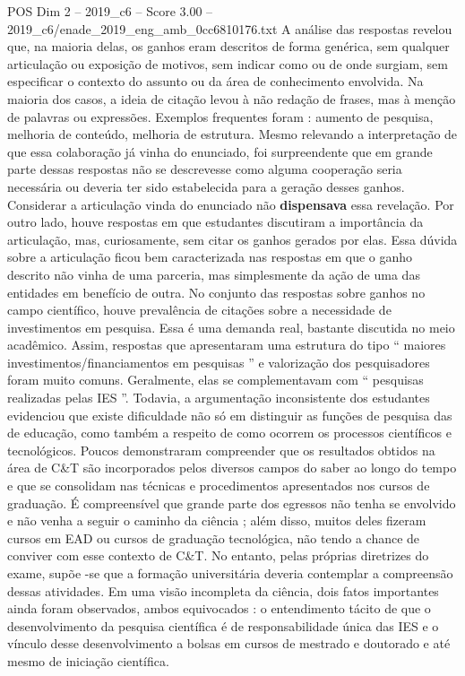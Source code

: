 \begin{textsample}{POS Dim 2 – 2019\_c6 – Score 3.00 – 2019\_c6/enade\_2019\_eng\_amb\_0cc6810176.txt}
A análise das respostas revelou que, na maioria delas, os ganhos eram descritos de forma genérica, sem qualquer articulação ou exposição de motivos, sem indicar como ou de onde surgiam, sem especificar o contexto do assunto ou da área de conhecimento envolvida.
Na maioria dos casos, a ideia de citação levou à não redação de frases, mas à menção de palavras ou expressões.
Exemplos frequentes foram : aumento de pesquisa, melhoria de conteúdo, melhoria de estrutura.
Mesmo relevando a interpretação de que essa colaboração já vinha do enunciado, foi surpreendente que em grande parte dessas respostas não se descrevesse como alguma cooperação seria necessária ou deveria ter sido estabelecida para a geração desses ganhos.
Considerar a articulação vinda do enunciado não \textbf{dispensava} essa revelação.
Por outro lado, houve respostas em que estudantes discutiram a importância da articulação, mas, curiosamente, sem citar os ganhos gerados por elas.
Essa dúvida sobre a articulação ficou bem caracterizada nas respostas em que o ganho descrito não vinha de uma parceria, mas simplesmente da ação de uma das entidades em benefício de outra.
No conjunto das respostas sobre ganhos no campo científico, houve prevalência de citações sobre a necessidade de investimentos em pesquisa.
Essa é uma demanda real, bastante discutida no meio acadêmico.
Assim, respostas que apresentaram uma estrutura do tipo “ maiores investimentos/financiamentos em pesquisas ” e valorização dos pesquisadores foram muito comuns.
Geralmente, elas se complementavam com “ pesquisas realizadas pelas IES ”.
Todavia, a argumentação inconsistente dos estudantes evidenciou que existe dificuldade não só em distinguir as funções de pesquisa das de educação, como também a respeito de como ocorrem os processos científicos e tecnológicos.
Poucos demonstraram compreender que os resultados obtidos na área de C\&T são incorporados pelos diversos campos do saber ao longo do tempo e que se consolidam nas técnicas e procedimentos apresentados nos cursos de graduação.
É compreensível que grande parte dos egressos não tenha se envolvido e não venha a seguir o caminho da ciência ; além disso, muitos deles fizeram cursos em EAD ou cursos de graduação tecnológica, não tendo a chance de conviver com esse contexto de C\&T.
No entanto, pelas próprias diretrizes do exame, supõe -se que a formação universitária deveria contemplar a compreensão dessas atividades.
Em uma visão incompleta da ciência, dois fatos importantes ainda foram observados, ambos equivocados : o entendimento tácito de que o desenvolvimento da pesquisa científica é de responsabilidade única das IES e o vínculo desse desenvolvimento a bolsas em cursos de mestrado e doutorado e até mesmo de iniciação científica.

\end{textsample}
